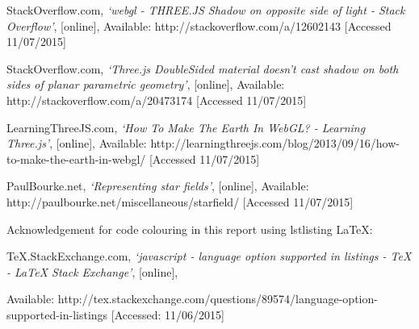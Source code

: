\documentclass[12pt]{article}
\begin{document}
\begin{thebibliography}{5}
 StackOverflow.com, {\em `webgl - THREE.JS Shadow on opposite side of light - Stack Overflow'}, [online],
Available: http://stackoverflow.com/a/12602143 [Accessed 11/07/2015]

 StackOverflow.com, {\em `Three.js DoubleSided material doesn't cast shadow on both sides of planar parametric geometry'}, [online],
Available: http://stackoverflow.com/a/20473174 [Accessed 11/07/2015]

 LearningThreeJS.com, {\em `How To Make The Earth In WebGL? - Learning Three.js'}, [online],
Available: http://learningthreejs.com/blog/2013/09/16/how-to-make-the-earth-in-webgl/ [Accessed 11/07/2015]

 PaulBourke.net, {\em `Representing star fields'}, [online],
Available: http://paulbourke.net/miscellaneous/starfield/ [Accessed 11/07/2015]

  Acknowledgement for code colouring in this report using lstlisting LaTeX: 

TeX.StackExchange.com, {\em `javascript - language option supported in listings - TeX - LaTeX Stack Exchange'}, [online],

Available: http://tex.stackexchange.com/questions/89574/language-option-supported-in-listings [Accessed: 11/06/2015]

\end{thebibliography}
\end{document}
